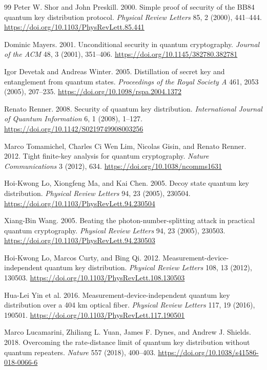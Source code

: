 \documentclass[conference,compsoc]{IEEEtran}
\begin{document}
\begin{thebibliography}{99}
Peter W. Shor and John Preskill.
2000.
Simple proof of security of the BB84 quantum key distribution protocol.
\emph{Physical Review Letters} 85, 2 (2000), 441--444.
\url{https://doi.org/10.1103/PhysRevLett.85.441}

Dominic Mayers.
2001.
Unconditional security in quantum cryptography.
\emph{Journal of the ACM} 48, 3 (2001), 351--406.
\url{https://doi.org/10.1145/382780.382781}

Igor Devetak and Andreas Winter.
2005.
Distillation of secret key and entanglement from quantum states.
\emph{Proceedings of the Royal Society A} 461, 2053 (2005), 207--235.
\url{https://doi.org/10.1098/rspa.2004.1372}

Renato Renner.
2008.
Security of quantum key distribution.
\emph{International Journal of Quantum Information} 6, 1 (2008), 1--127.
\url{https://doi.org/10.1142/S0219749908003256}

Marco Tomamichel, Charles Ci Wen Lim, Nicolas Gisin, and Renato Renner.
2012.
Tight finite-key analysis for quantum cryptography.
\emph{Nature Communications} 3 (2012), 634.
\url{https://doi.org/10.1038/ncomms1631}

Hoi-Kwong Lo, Xiongfeng Ma, and Kai Chen.
2005.
Decoy state quantum key distribution.
\emph{Physical Review Letters} 94, 23 (2005), 230504.
\url{https://doi.org/10.1103/PhysRevLett.94.230504}

Xiang-Bin Wang.
2005.
Beating the photon-number-splitting attack in practical quantum cryptography.
\emph{Physical Review Letters} 94, 23 (2005), 230503.
\url{https://doi.org/10.1103/PhysRevLett.94.230503}

Hoi-Kwong Lo, Marcos Curty, and Bing Qi.
2012.
Measurement-device-independent quantum key distribution.
\emph{Physical Review Letters} 108, 13 (2012), 130503.
\url{https://doi.org/10.1103/PhysRevLett.108.130503}

Hua-Lei Yin et al.
2016.
Measurement-device-independent quantum key distribution over a 404 km optical fiber.
\emph{Physical Review Letters} 117, 19 (2016), 190501.
\url{https://doi.org/10.1103/PhysRevLett.117.190501}

Marco Lucamarini, Zhiliang L. Yuan, James F. Dynes, and Andrew J. Shields.
2018.
Overcoming the rate-distance limit of quantum key distribution without quantum repeaters.
\emph{Nature} 557 (2018), 400--403.
\url{https://doi.org/10.1038/s41586-018-0066-6}


\end{thebibliography}
\end{document}
